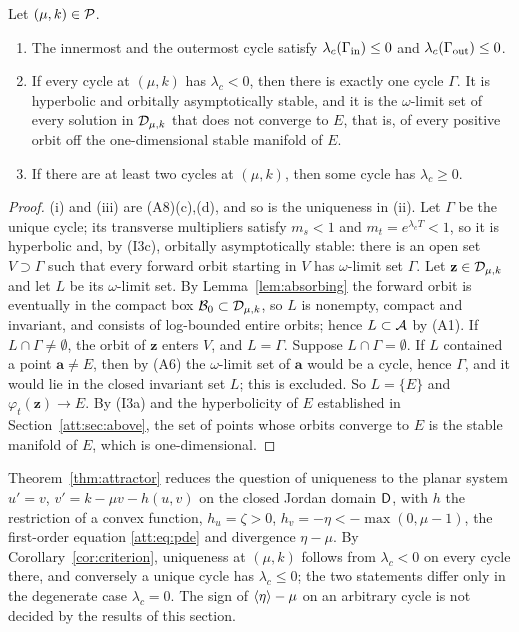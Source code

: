 \begin{corollary}\label{cor:criterion}
Let $(\mu,k)\in\mathcal P$.
\begin{enumerate}[label=\textup{(\roman*)}]
\item The innermost and the outermost cycle satisfy $\lambda_c(\Gamma_{\rm in})\le0$ and $\lambda_c(\Gamma_{\rm out})\le0$.
\item If every cycle at $(\mu,k)$ has $\lambda_c<0$, then there is exactly one cycle $\Gamma$. It is hyperbolic and orbitally asymptotically stable, and it is the $\omega$-limit set of every solution in $\mathcal D_{\mu,k}$ that does not converge to $E$, that is, of every positive orbit off the one-dimensional stable manifold of $E$.
\item If there are at least two cycles at $(\mu,k)$, then some cycle has $\lambda_c\ge0$.
\end{enumerate}
\end{corollary}
\begin{proof}
(i) and (iii) are (A8)(c),(d), and so is the uniqueness in (ii). Let $\Gamma$ be the unique cycle; its transverse multipliers satisfy $m_s<1$ and $m_t=e^{\lambda_cT}<1$, so it is hyperbolic and, by (I3c), orbitally asymptotically stable: there is an open set $V\supset\Gamma$ such that every forward orbit starting in $V$ has $\omega$-limit set $\Gamma$. Let $\mathbf z\in\mathcal D_{\mu,k}$ and let $L$ be its $\omega$-limit set. By Lemma~\ref{lem:absorbing} the forward orbit is eventually in the compact box $\mathcal B_0\subset\mathcal D_{\mu,k}$, so $L$ is nonempty, compact and invariant, and consists of log-bounded entire orbits; hence $L\subset\mathcal A$ by (A1). If $L\cap\Gamma\ne\emptyset$, the orbit of $\mathbf z$ enters $V$, and $L=\Gamma$. Suppose $L\cap\Gamma=\emptyset$. If $L$ contained a point $\mathbf a\ne E$, then by (A6) the $\omega$-limit set of $\mathbf a$ would be a cycle, hence $\Gamma$, and it would lie in the closed invariant set $L$; this is excluded. So $L=\{E\}$ and $\varphi_t(\mathbf z)\to E$. By (I3a) and the hyperbolicity of $E$ established in Section~\ref{att:sec:above}, the set of points whose orbits converge to $E$ is the stable manifold of $E$, which is one-dimensional.
\end{proof}

\begin{remark}\label{att:rem:status}
Theorem~\ref{thm:attractor} reduces the question of uniqueness to the planar system $u'=v$, $v'=k-\mu v-h(u,v)$ on the closed Jordan domain $\mathsf D$, with $h$ the restriction of a convex function, $h_u=\zeta>0$, $h_v=-\eta<-\max(0,\mu-1)$, the first-order equation \eqref{att:eq:pde} and divergence $\eta-\mu$. By Corollary~\ref{cor:criterion}, uniqueness at $(\mu,k)$ follows from $\lambda_c<0$ on every cycle there, and conversely a unique cycle has $\lambda_c\le0$; the two statements differ only in the degenerate case $\lambda_c=0$. The sign of $\left\langle \eta\right\rangle-\mu$ on an arbitrary cycle is not decided by the results of this section.
\end{remark}

